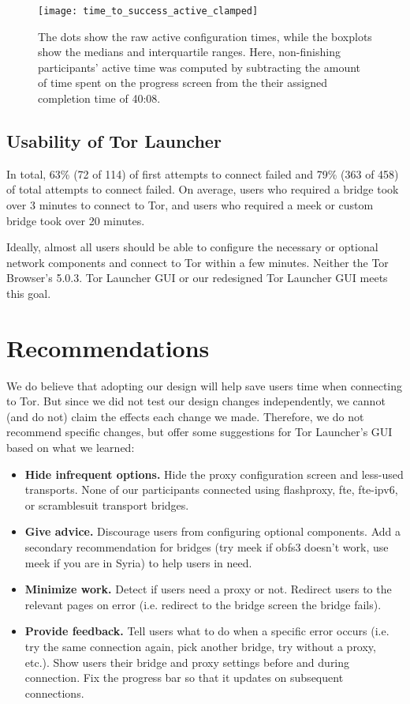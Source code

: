 \documentclass[USenglish,oneside,twocolumn]{article}
\begin{document}
\begin{figure}[t]
\centering
\texttt{[image: time\_to\_success\_active\_clamped]}
\caption{
The dots show the raw active configuration times,
while the boxplots show the medians and interquartile ranges.
Here, non-finishing participants' active time was computed by
subtracting the amount of time spent on the progress screen from the 
their assigned completion time of 40:08.
}
\label{fig:time_to_success_active_clamped}
\end{figure}

\subsection{Usability of Tor Launcher} 
In total, 63\% (72 of 114) of first attempts to connect failed and 79\% (363 of 458) of total attempts to connect failed. 
On average, users who required a bridge took over 3 minutes to connect to Tor, and users who required a meek or custom bridge took over 20 minutes.

Ideally, almost all users should be able to configure the necessary or optional network components and connect to Tor within a few minutes. Neither the Tor Browser's 5.0.3. Tor Launcher GUI or our redesigned Tor Launcher GUI meets this goal.

\section{Recommendations}
\label{sec:recommendations}
We do believe that adopting our design will help save users time when connecting to Tor. But since we did not test our design changes independently, we cannot (and do not) claim the effects each change we made. Therefore, we do not recommend specific changes, but offer some suggestions for Tor Launcher's GUI based on what we learned: \\

\begin{itemize}
\item {\bfseries Hide infrequent options.} Hide the proxy configuration screen and less-used transports. None of our participants connected using flashproxy, fte, fte-ipv6, or scramblesuit transport bridges. 
\item {\bfseries Give advice.} Discourage users from configuring optional components. Add a secondary recommendation for bridges (try meek if obfs3 doesn't work, use meek if you are in Syria) to help users in need. 
\item {\bfseries Minimize work.} Detect if users need a proxy or not. Redirect users to the relevant pages on error (i.e. redirect to the bridge screen the bridge fails).  
\item {\bfseries Provide feedback.} Tell users what to do when a specific error occurs (i.e. try the same connection again, pick another bridge, try without a proxy, etc.).  Show users their bridge and proxy settings before and during connection. Fix the progress bar so that it updates on subsequent connections.
\end{itemize}
\end{document}
